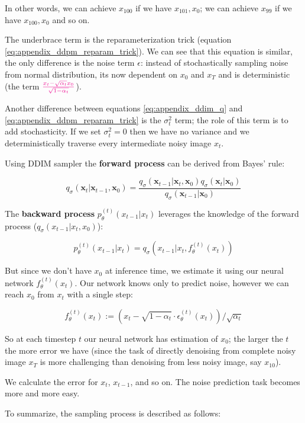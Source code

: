 In other words, we can achieve $x_100$ if we have $x_101, x_0$; we can achieve $x_99$ if we have $x_100, x_0$ and so on.

The underbrace term is the reparameterization trick (equation \ref{eq:appendix_ddpm_reparam_trick}). We can see that this equation is similar, the only difference is the noise term $\epsilon$: instead of stochastically sampling noise from normal distribution, its now dependent on $x_0$ and $x_T$ and is deterministic (the term $\textcolor{magenta}{\frac{x_t - \sqrt{\alpha_t} x_0}{\sqrt{1 - \alpha_t}}}$).

Another difference between equations \ref{eq:appendix_ddim_q} and \ref{eq:appendix_ddpm_reparam_trick} is the $\sigma_t^2$ term; the role of this term is to add stochasticity. If we set $\sigma_t^2 = 0$ then we have no variance and we deterministically traverse every intermediate noisy image $x_t$.

Using DDIM sampler the \textbf{forward process} can be derived from Bayes' rule:

\[ q_{\sigma}(\mathbf{x}_t | \mathbf{x}_{t-1}, \mathbf{x}_0) = \frac{q_{\sigma}(\mathbf{x}_{t-1} | \mathbf{x}_t, \mathbf{x}_0) q_{\sigma}(\mathbf{x}_t | \mathbf{x}_0)}{q_{\sigma}(\mathbf{x}_{t-1} | \mathbf{x}_0)} \]

The \textbf{backward process} $p_\theta^{(t)} (x_{t-1} | x_t)$ leverages the knowledge of the forward process ($q_\sigma (x_{t-1} | x_t, x_0)$):

\[ p_\theta^{(t)} (x_{t-1} | x_t) = q_\sigma (x_{t-1} | x_t, f_\theta^{(t)} (x_t)) \]

But since we don't have $x_0$ at inference time, we estimate it using our neural network $f_\theta^{(t)} (x_t)$. Our network knows only to predict noise, however we can reach $x_0$ from $x_t$ with a single step:

\[ f_\theta^{(t)} (x_t) := \left( x_t - \sqrt{1 - \alpha_t} \cdot \epsilon_\theta^{(t)} (x_t) \right) / \sqrt{\alpha_t} \]

So at each timestep $t$ our neural network has estimation of $x_0$; the larger the $t$ the more error we have (since the task of directly denoising from complete noisy image $x_T$ is more challenging than denoising from less noisy image, say $x_{10}$).

We calculate the error for $x_t$, $x_{t-1}$, and so on. The noise prediction task becomes more and more easy.

To summarize, the sampling process is described as follows:

